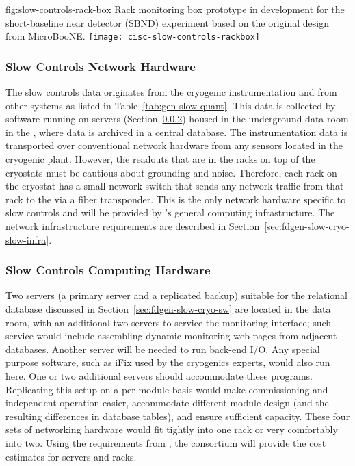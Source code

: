 \begin{dunefigure}{fig:slow-controls-rack-box}
{Rack monitoring box prototype in development for the short-baseline near detector (SBND) experiment based on the original design from MicroBooNE.}
\texttt{[image: cisc-slow-controls-rackbox]}
\end{dunefigure}


\subsubsection{Slow Controls Network Hardware}
\label{sec:fdgen-slow-cryo-slow-network}
The slow controls data originates from the cryogenic instrumentation and from other systems as listed in Table~\ref{tab:gen-slow-quant}. This data is collected by software running on servers
(Section~\ref{sec:fdgen-slow-cryo-slow-compute})
housed in the underground data room in the ,
where data is archived in a central  database.
The instrumentation data is transported over
conventional network hardware from any sensors located in the cryogenic
plant.  However, the readouts that are in the racks on top of the
cryostats must be cautious about grounding and noise.  Therefore, each
rack on the cryostat has a small network switch that sends
any network traffic from that rack to the  via a fiber transponder.
This is the only network hardware specific to slow controls and will be provided by %
\surf{}'s  
general computing infrastructure. %
The network infrastructure requirements are described in
Section~\ref{sec:fdgen-slow-cryo-slow-infra}.

\subsubsection{Slow Controls Computing Hardware}
\label{sec:fdgen-slow-cryo-slow-compute}
Two servers (a primary server and a replicated backup) suitable for the relational database discussed
in Section~\ref{sec:fdgen-slow-cryo-sw} are located in the  data
room, with an additional
two servers to service the  monitoring interface; such service would include assembling dynamic  monitoring web pages from adjacent
databases.  Another server will be needed to run back-end I/O.  Any special purpose software, such as iFix used by the cryogenics experts, would
also run here. One or two additional servers should accommodate these programs.
Replicating this setup on a per-module basis would make commissioning and independent operation easier, accommodate different module
design (and the resulting differences in database tables), and ensure
sufficient capacity.  These four sets of networking hardware would fit tightly into one rack or very comfortably into two. Using the requirements from , the  consortium will provide the cost estimates for servers and racks. 

